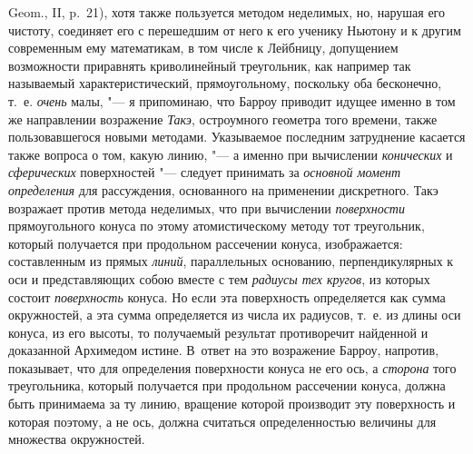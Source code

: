 Geom., II, p.~21), хотя также пользуется методом неделимых, но, нарушая его
чистоту, соединяет его с перешедшим от него к его ученику Ньютону и к
другим современным ему математикам, в том числе к Лейбницу, допущением
возможности приравнять криволинейный треугольник, как например так
называемый характеристический, прямоугольному, поскольку оба
бесконечно, т.~е. {\em очень} малы, "--- я припоминаю, что
Барроу приводит идущее именно в том же направлении возражение
{\em Такэ}, остроумного геометра того времени, также
пользовавшегося новыми методами. Указываемое последним затруднение касается
также вопроса о том, какую линию, "--- а именно при вычислении
{\em конических} и {\em сферических} поверхностей "--- следует принимать за
{\em основной момент определения} для рассуждения,
основанного на применении дискретного. Такэ возражает против метода
неделимых, что при вычислении {\em поверхности}
прямоугольного конуса по этому атомистическому методу тот треугольник,
который получается при продольном рассечении конуса, изображается:
составленным из прямых {\em линий}, параллельных
основанию, перпендикулярных к оси и представляющих собою вместе с тем
{\em радиусы тех кругов}, из которых состоит
{\em поверхность }конуса. Но если эта поверхность
определяется как сумма окружностей, а эта сумма определяется из числа их
радиусов, т.~е. из длины оси конуса, из его высоты, то получаемый результат
противоречит найденной и доказанной Архимедом истине. В~ответ на это
возражение Барроу, напротив, показывает, что для определения поверхности
конуса не его ось, а {\em сторона} того треугольника,
который получается при продольном рассечении конуса, должна быть принимаема
за ту линию, вращение которой производит эту поверхность и которая поэтому,
а не ось, должна считаться определенностью величины для множества
окружностей.

